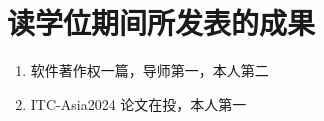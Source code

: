 \chapter{读学位期间所发表的成果}

\begin{enumerate}
	\renewcommand{\labelenumi}{[\theenumi]}
    \item 软件著作权一篇，导师第一，本人第二
    \item ITC-Asia2024 论文在投，本人第一
\end{enumerate}
